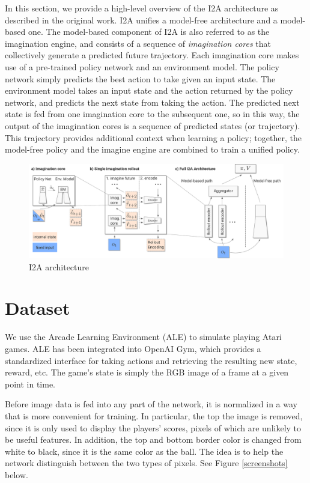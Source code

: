 \documentclass[10pt, twocolumn]{article}
\begin{document}
In this section, we provide a high-level overview of the I2A architecture as described in the original work. I2A unifies a model-free 
architecture and a model-based one. The model-based component of I2A is also referred to as the imagination engine, and consists of a 
sequence of \emph{imagination cores} that collectively generate a predicted future trajectory. Each imagination core makes use of a pre-trained policy network and an environment model. The policy network simply predicts the best action to take given an input state. The environment model takes an input state and the action returned by the policy network, and predicts the next state from taking the action. The predicted next state is fed from one imagination core to the subsequent one, so in this way, the output of the imagination cores is a sequence of predicted states (or trajectory). This trajectory provides additional context when learning a policy; together, the model-free policy and the imagine engine are combined to train a unified policy.

\begin{figure}
\centering
\includegraphics[scale=0.3]{i2a}
\caption{I2A architecture}
\end{figure}

\section{Dataset}
We use the Arcade Learning Environment (ALE) to simulate playing Atari games. ALE has been integrated
into OpenAI Gym, which provides a standardized interface for taking actions and retrieving the resulting new
state, reward, etc. The game's state is simply the RGB image of a frame at a given point in time.

Before image data is fed into any part of the network, it is normalized in a way that is more convenient for training.
In particular, the top the image is removed, since it is only used to display the players' scores, pixels of which are
unlikely to be useful features. In addition, the top and bottom border color is changed from white to black, since
it is the same color as the ball. The idea is to help the network distinguish between the two types of pixels.
See Figure \ref{screenshots} below.
\end{document}
